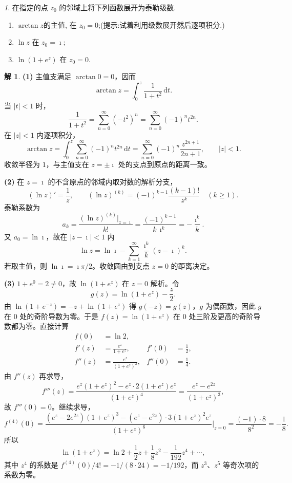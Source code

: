 \documentclass[11pt]{article}
\theoremstyle{remark}
\newtheorem{problem}{}
\theoremstyle{definition}
\newtheorem{solution}{解}
\begin{document}
\renewcommand{\labelenumi}{(\arabic{enumi})}
\renewcommand{\labelenumii}{(\arabic{enumi}.\arabic{enumii})}

\begin{problem}
  在指定的点 $z_0$ 的邻域上将下列函数展开为泰勒级数.
  \begin{enumerate}
    \item $\arctan z$的主值, 在 $z_0=0$;(提示:试着利用级数展开然后逐项积分.)
    \item $\ln z$ 在 $z_0=\imath$;
    \item $\ln \left(1+e^z\right)$ 在 $z_0=0$.
  \end{enumerate}
\end{problem}

\begin{solution}
\textbf{(1)}
主值支满足 $\arctan 0=0$，因而
\[
\arctan z=\int_{0}^{z}\frac{1}{1+t^{2}}\,\mathrm{d}t.
\]
当 $|t|<1$ 时，
\[
\frac{1}{1+t^{2}}=\sum_{n=0}^{\infty}(-t^{2})^{n}=\sum_{n=0}^{\infty}(-1)^{n}t^{2n}.
\]
在 $|z|<1$ 内逐项积分，
\[
\arctan z
=\int_{0}^{z}\sum_{n=0}^{\infty}(-1)^{n}t^{2n}\,\mathrm{d}t
=\sum_{n=0}^{\infty}(-1)^{n}\frac{z^{2n+1}}{2n+1},\qquad |z|<1.
\]
收敛半径为 $1$，与主值支在 $z=\pm\imath$ 处的支点到原点的距离一致。

\textbf{(2)}
在 $z=\imath$ 的不含原点的邻域内取对数的解析分支，
\[
(\ln z)'=\frac{1}{z},\qquad
(\ln z)^{(k)}=(-1)^{k-1}\frac{(k-1)!}{z^{k}}\quad(k\geq 1).
\]
泰勒系数为
\[
a_{k}
=\frac{(\ln z)^{(k)}\big|_{z=\imath}}{k!}
=\frac{(-1)^{k-1}}{k\,\imath^{k}}
=-\frac{\imath^{k}}{k}.
\]
又 $a_{0}=\ln\imath$，故在 $|z-\imath|<1$ 内
\[
\ln z
=\ln\imath-\sum_{k=1}^{\infty}\frac{\imath^{k}}{k}(z-\imath)^{k}.
\]
若取主值，则 $\ln\imath=\imath\pi/2$。收敛圆由到支点 $z=0$ 的距离决定。

\textbf{(3)}
$1+e^{0}=2\neq 0$，故 $\ln(1+e^{z})$ 在 $z=0$ 解析。令
\[
g(z)=\ln(1+e^{z})-\frac{z}{2}.
\]
由 $\ln(1+e^{-z})=-z+\ln(1+e^{z})$ 得 $g(-z)=g(z)$，$g$ 为偶函数，因此 $g$ 在 $0$ 处的奇阶导数为零。于是 $f(z)=\ln(1+e^{z})$ 在 $0$ 处三阶及更高的奇阶导数都为零。直接计算
\begin{align*}
f(0)&=\ln 2,\\
f'(z)&=\frac{e^{z}}{1+e^{z}},&
f'(0)&=\frac12,\\
f''(z)&=\frac{e^{z}}{(1+e^{z})^{2}},&
f''(0)&=\frac14.
\end{align*}
由 $f''(z)$ 再求导，
\[
f'''(z)
=\frac{e^{z}(1+e^{z})^{2}-e^{z}\cdot 2(1+e^{z})e^{z}}{(1+e^{z})^{4}}
=\frac{e^{z}-e^{2z}}{(1+e^{z})^{3}},
\]
故 $f'''(0)=0$。继续求导，
\[
f^{(4)}(0)
=\frac{(e^{z}-2e^{2z})(1+e^{z})^{3}-(e^{z}-e^{2z})\cdot 3(1+e^{z})^{2}e^{z}}{(1+e^{z})^{6}}\bigg|_{z=0}
=\frac{(-1)\cdot 8}{8^{2}}
=-\frac18.
\]
所以
\[
\ln(1+e^{z})
=\ln 2+\frac12 z+\frac{1}{8}z^{2}-\frac{1}{192}z^{4}+\cdots,
\]
其中 $z^{4}$ 的系数是 $f^{(4)}(0)/4!=-1/(8\cdot 24)=-1/192$，而 $z^{3}$、$z^{5}$ 等奇次项的系数为零。
\end{solution}
\end{document}
